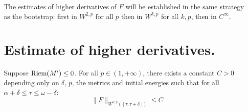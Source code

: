 The estimates of higher derivatives of \(F\) will be established in the same strategy as
the bootstrap: first in \(W^{2,p}\) for all \(p\) then in \(W^{k,p}\) for all \(k,p\), then in \(C^\infty\).

\section{Estimate of higher derivatives.}
\label{sec:org50e3df5}

\begin{lemma}[\( W^{2,p} \)-boundedness]
\label{lem:bound-2-p}
Suppose \(\mathop{\rm Riem}\nolimits(M') \leq 0\). For all \(p \in (1,+\infty)\), there exists a constant \(C>0\) depending only on \(\delta\), \(p\), the metrics and initial energies such that for all \(\alpha +\delta \leq \tau \leq \omega-\delta\):
\[
\|F\|_{W^{2,p}([\tau,\tau+\delta])}\leq C
\]
\end{lemma}

